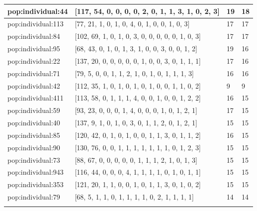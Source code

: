 \begin{table}
\begin{tabular}{p{3cm} p{4cm} p{3cm} p{3cm}}
\small{pop:individual:44} & \small{[117, 54, 0, 0, 0, 0, 2, 0, 1, 1, 3, 1, 0, 2, 3]}
& \small{19} & \small{18}\\ \hline
\small{pop:individual:113} & \small{[77, 21, 1, 0, 1, 0, 4, 0, 1, 0, 0, 1, 0, 3]}
& \small{17} & \small{17}\\ \hline
\small{pop:individual:84} & \small{[102, 69, 1, 0, 1, 0, 3, 0, 0, 0, 0, 0, 1, 0, 3]}
& \small{17} & \small{17}\\ \hline
\small{pop:individual:95} & \small{[68, 43, 0, 1, 0, 1, 3, 1, 0, 0, 3, 0, 0, 1, 2]}
& \small{19} & \small{16}\\ \hline
\small{pop:individual:22} & \small{[137, 20, 0, 0, 0, 0, 0, 1, 0, 0, 3, 0, 1, 1, 1]}
& \small{17} & \small{16}\\ \hline
\small{pop:individual:71} & \small{[79, 5, 0, 0, 1, 1, 2, 1, 0, 1, 0, 1, 1, 1, 3]}
& \small{16} & \small{16}\\ \hline
\small{pop:individual:42} & \small{[112, 35, 1, 0, 1, 0, 1, 0, 1, 0, 0, 1, 1, 0, 2]}
& \small{9} & \small{9}\\ \hline
\small{pop:individual:411} & \small{[113, 58, 0, 1, 1, 1, 4, 0, 0, 1, 0, 0, 1, 2, 2]}
& \small{16} & \small{15}\\ \hline
\small{pop:individual:59} & \small{[93, 23, 0, 0, 0, 1, 4, 0, 0, 0, 1, 0, 1, 2, 1]}
& \small{17} & \small{15}\\ \hline
\small{pop:individual:40} & \small{[137, 9, 1, 0, 1, 0, 3, 0, 1, 1, 2, 0, 1, 2, 1]}
& \small{15} & \small{15}\\ \hline
\small{pop:individual:85} & \small{[120, 42, 0, 1, 0, 1, 0, 0, 1, 1, 3, 0, 1, 1, 2]}
& \small{16} & \small{15}\\ \hline
\small{pop:individual:90} & \small{[130, 76, 0, 0, 1, 1, 1, 1, 1, 1, 1, 0, 1, 2, 3]}
& \small{15} & \small{15}\\ \hline
\small{pop:individual:73} & \small{[88, 67, 0, 0, 0, 0, 0, 1, 1, 1, 2, 1, 0, 1, 3]}
& \small{15} & \small{15}\\ \hline
\small{pop:individual:943} & \small{[116, 44, 0, 0, 0, 4, 1, 1, 1, 1, 0, 1, 0, 1, 1]}
& \small{15} & \small{15}\\ \hline
\small{pop:individual:353} & \small{[121, 20, 1, 1, 0, 0, 1, 0, 1, 1, 3, 0, 1, 0, 2]}
& \small{15} & \small{15}\\ \hline
\small{pop:individual:79} & \small{[68, 5, 1, 1, 0, 1, 1, 1, 1, 0, 2, 1, 1, 1, 1]}
& \small{14} & \small{14}\\ \hline
\noalign{\smallskip}\hline
\end{tabular}
\end{table}

